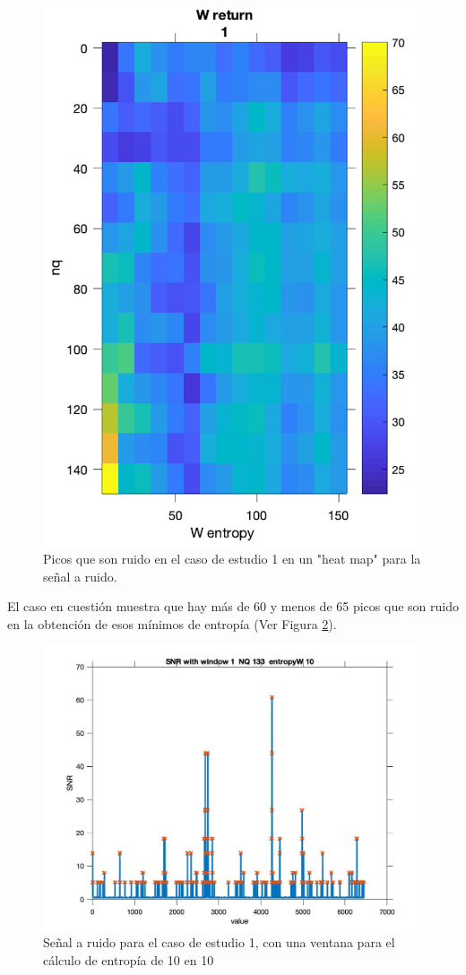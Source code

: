 \begin{figure}[h]
	\centering
	\includegraphics[width=0.7\linewidth]{figures/ejemplo_SNR}
	\caption{Picos que son ruido en el caso de estudio 1 en un "heat map" para la señal a ruido.}
	\label{caso1SNR}
\end{figure}

El caso en cuestión muestra que hay más de 60 y menos de 65 picos que son ruido en la obtención de esos mínimos de entropía (Ver Figura \ref{caso1SNR_individual}). 
\begin{figure}[h!]
	\centering
	\includegraphics[width=12cm]{figures_matlab/SNR_window_1_NQ_133_entropyW_10.jpg}
	\caption{Señal a ruido para el caso de estudio 1, con una ventana para el cálculo de entropía de 10 en 10 }
	\label{caso1SNR_individual}
\end{figure}


